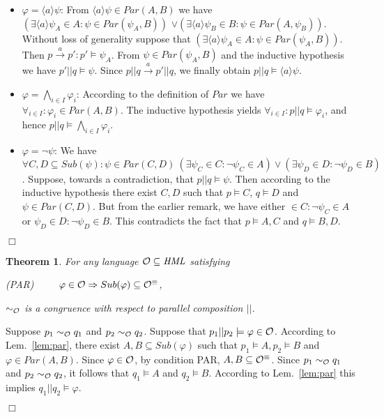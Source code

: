 \documentclass{eptcs}
\def\hmo{{\cal O}}
\def\hml{{\it HML}}
\def\hmeq{\sim_{\cal O}}
\def\transa{\stackrel{a}{\rightarrow}}
\def\transa{\stackrel{a}{\rightarrow}}
\def\implies{\Rightarrow}
\newtheorem{theo}{Theorem}
\newenvironment{theorem}{\begin{theo} \rm }{\end{theo}}
\newenvironment{proof}{\begin{trivlist} \item[\hspace{\labelsep}\bf Proof:]}{\hfill $\Box$ \end{trivlist}}
\newcommand{\diam}[1]{\langle#1\rangle}
\begin{document}
\begin{proof}
\begin{itemize}
\item $\varphi = \diam{a} \psi$: From $\diam{a} \psi \in Par(A,B)$ we have $( \exists \diam{a} \psi_A \in A: \psi \in Par(\psi_A,B))$
$\vee ( \exists \diam{a} \psi_B \in B: \psi \in Par(A,\psi_B))$. Without loss of generality suppose that $(\exists \diam{a} \psi_A \in A: \psi \in Par(\psi_A,B))$. Then $p \transa p': p' \models \psi_A$. From $\psi \in Par(\psi_A,B)$ and the inductive hypothesis we have $p' || q \models \psi$. Since $p || q \transa p' || q$, we finally obtain $p||q \models \diam{a} \psi$.

\item $\varphi = \bigwedge_{i\in I} \varphi_i$: According to the definition of $Par$ we have $\forall_{i \in I}: \varphi_i \in Par(A,B)$. The inductive hypothesis yields $\forall_{i \in I}: p||q \models \varphi_i$, and hence $p||q \models \bigwedge_{i\in I} \varphi_i$.

\item $\varphi = \neg \psi$:  We have $\forall C,D \subseteq Sub(\psi): \psi \in Par(C,D) ~ (\exists \psi_C \in C: \neg \psi_C \in A) \vee (\exists \psi_D \in D: \neg \psi_D \in B)$. Suppose, towards a contradiction, that $p||q \models \psi$. Then according to the inductive hypothesis there exist $C,D$ such that $p \models C$, $q \models D$ and $\psi \in Par(C,D)$. But from the earlier remark, we have either $\in C: \neg \psi_C \in A$ or $\psi_D \in D: \neg \psi_D \in B$. This contradicts the fact that $p \models A,C$ and $q \models B,D$.

\end{itemize}
\end{proof}

\begin{theorem} For any language $\hmo \subseteq \hml$ satisfying 
\begin{center}
(PAR)~~~~~$\varphi \in \hmo \implies Sub(\varphi) \subseteq \hmo^\equiv$,
\end{center}
 $\hmeq$ is a congruence with respect to parallel composition $||$.
\end{theorem}
\begin{proof}
Suppose $p_1 \hmeq q_1$ and $p_2 \hmeq q_2$. Suppose that $p_1 || p_2 \models \varphi \in \hmo$. According to Lem.~\ref{lem:par}, there exist $ A,B \subseteq Sub(\varphi)$ such that $p_1 \models A, p_2 \models B$ and $\varphi \in Par(A,B)$. Since $\varphi \in \hmo$, by condition PAR, $A,B\subseteq\hmo^\equiv$. Since $p_1 \hmeq q_1$ and $p_2 \hmeq q_2$, it follows that $q_1 \models A$ and $q_2 \models B$. According to Lem.~\ref{lem:par} this implies $q_1 || q_2 \models \varphi$.

\end{proof}
\end{document}
